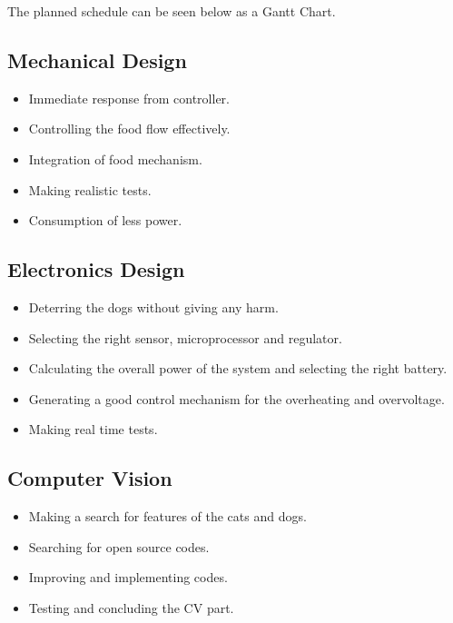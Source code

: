 The planned schedule can be seen below as a Gantt Chart.
 
\subsection{Mechanical Design} \label{sec:sol_proc} %
\begin{itemize}
\item Immediate response from controller. 

\item Controlling the food flow effectively.

\item Integration of food mechanism.

\item Making realistic tests.

\item Consumption of less power. 
\end{itemize}

\subsection{Electronics Design} \label{sec:sol_proc} %

\begin{itemize}
\item Deterring the dogs without giving any harm. 

\item Selecting the right sensor, microprocessor and regulator.

\item Calculating the overall power of the system and selecting the right battery. 

\item Generating a good control mechanism for the overheating and overvoltage.

\item Making real time tests.

\end{itemize}

\subsection{Computer Vision} \label{sec:sol_proc} %
\begin{itemize}
\item Making a search for features of the cats and dogs.

\item Searching for open source codes. 

\item Improving and implementing codes. 

\item Testing and concluding the CV part.  

\end{itemize}
